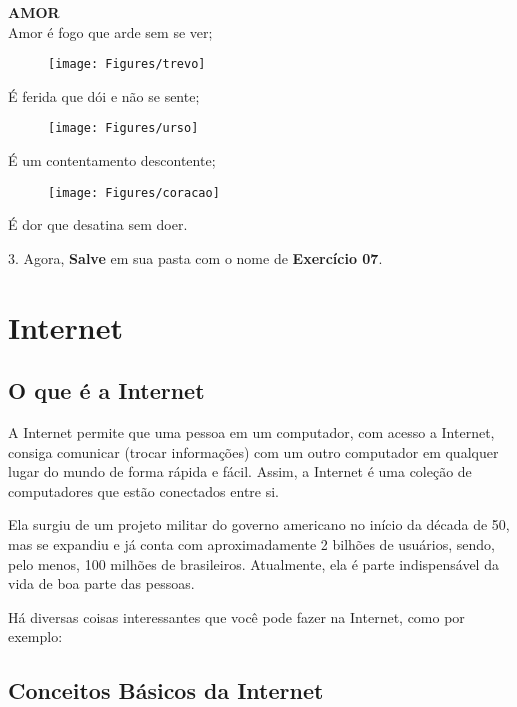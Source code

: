 \documentclass[hidelinks,12pt]{article}
\begin{document}
		{\centering \textbf{AMOR}\\

			Amor é fogo que arde sem se ver;
			\begin{figure}[!h]
				\centering
				\texttt{[image: Figures/trevo]}

			\end{figure}

			É ferida que dói e não se sente;
			\begin{figure}[!h]
				\centering
				\texttt{[image: Figures/urso]}
			\end{figure}

			É um contentamento descontente;

			\begin{figure}[!h]
				\centering
				\texttt{[image: Figures/coracao]}
			\end{figure}
			É dor que desatina sem doer.

			}
			\bigskip

		3. Agora, \textbf{Salve} em sua pasta com o nome de \textbf{Exercício 07}.

\section{Internet}

	\subsection{O que é a Internet}
	
	A Internet permite que uma pessoa em um computador, com acesso a Internet, consiga comunicar (trocar informações) com um outro computador em qualquer lugar do mundo de forma rápida e fácil. Assim, a Internet é uma coleção de computadores que estão conectados entre si.

	Ela surgiu de um projeto militar do governo americano no início da década de 50, mas se expandiu e já conta com aproximadamente 2 bilhões de usuários, sendo, pelo menos, 100 milhões de brasileiros. Atualmente, ela é parte indispensável da vida de boa parte das pessoas.
	
	Há diversas coisas interessantes que você pode fazer na Internet, como por exemplo:
	
	

	\subsection{Conceitos Básicos da Internet}
\end{document}
